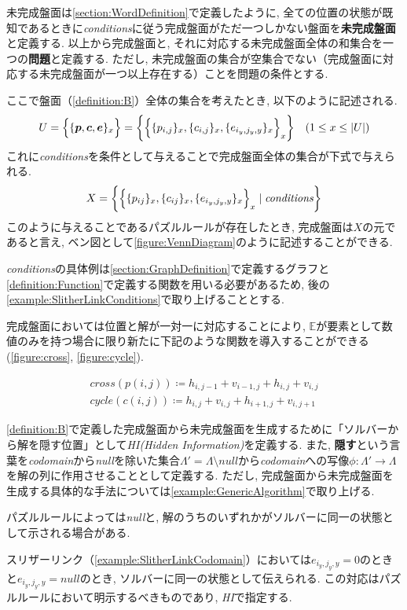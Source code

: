 未完成盤面は\cref{section:WordDefinition}で定義したように, 全ての位置の状態が既知であるときに\textit{conditions}に従う完成盤面がただ一つしかない盤面を\textbf{未完成盤面}と定義する.
以上から完成盤面と, それに対応する未完成盤面全体の和集合を一つの\textbf{問題}と定義する. ただし, 未完成盤面の集合が空集合でない（完成盤面に対応する未完成盤面が一つ以上存在する）ことを問題の条件とする.

ここで盤面（\cref{definition:B}）全体の集合を考えたとき, 以下のように記述される.
\begin{equation}\label{equation:U}
  U=\Bigl\{\{\bm{p},\bm{c},\bm{e}\}_x\Bigr\}=\biggl\{\Bigl\{\{p_{i,j}\}_x,\{c_{i,j}\}_x,\{e_{i_y,j_y,y}\}_x\Bigr\}_x\biggr\} \quad (1\leq x \leq |U|)
\end{equation}
これに\textit{conditions}を条件として与えることで完成盤面全体の集合が下式で与えられる.
\begin{equation}\label{equation:X}
  X=\biggl\{\Bigl\{\{p_{ij}\}_x,\{c_{ij}\}_x,\{e_{i_y,j_y,y}\}_x\Bigr\}_x\mid \rm{\textit{conditions}}\biggr\}
\end{equation}
このように与えることであるパズルルールが存在したとき, 完成盤面は$X$の元であると言え, ベン図として\cref{figure:VennDiagram}のように記述することができる.

\textit{conditions}の具体例は\cref{section:GraphDefinition}で定義するグラフと\cref{definition:Function}で定義する関数を用いる必要があるため, 後の\cref{example:SlitherLinkConditions}で取り上げることとする.

完成盤面においては位置と解が一対一に対応することにより, $\mathbb{E}$が要素として数値のみを持つ場合に限り新たに下記のような関数を導入することができる(\cref{figure:cross}, \cref{figure:cycle}).

\begin{definition}\label{definition:Function}
  \begin{align}
    \textit{cross}(p(i,j))\coloneqq h_{i,j-1}+v_{i-1,j}+h_{i,j}+v_{i,j} \\
    \textit{cycle}(c(i,j))\coloneqq h_{i,j}+v_{i,j}+h_{i+1,j}+v_{i,j+1}
  \end{align}
\end{definition}


\cref{definition:B}で定義した完成盤面から未完成盤面を生成するために「ソルバーから解を隠す位置」として\textit{HI(Hidden Information)}を定義する.
また, \textbf{隠す}という言葉を\textit{codomain}から\textit{null}を除いた集合$\Lambda'=\Lambda \setminus \textit{null}$から\textit{codomain}への写像$\phi\colon \Lambda' \longrightarrow \Lambda$を解の列に作用させることとして定義する. ただし, 完成盤面から未完成盤面を生成する具体的な手法については\cref{example:GenericAlgorithm}で取り上げる.
\begin{remark}\label{remark:Null}
  パズルルールによっては\textit{null}と, 解のうちのいずれかがソルバーに同一の状態として示される場合がある.
\end{remark}
スリザーリンク（\cref{example:SlitherLinkCodomain}）においては$e_{i_y,j_y,y} = 0$のときと$e_{i_y,j_y,y}=\textit{null}$のとき, ソルバーに同一の状態として伝えられる. この対応はパズルルールにおいて明示するべきものであり, \textit{HI}で指定する.


